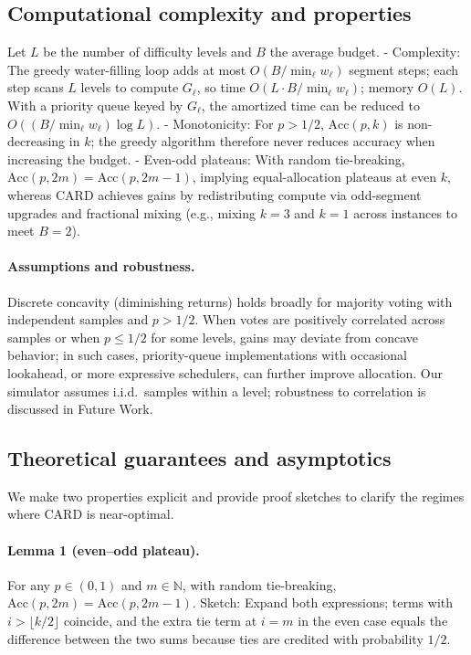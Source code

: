 \documentclass[11pt]{article}
\begin{document}
\subsection{Computational complexity and properties}
Let $L$ be the number of difficulty levels and $B$ the average budget.
- Complexity: The greedy water-filling loop adds at most $O(B/\min_\ell w_\ell)$ segment steps; each step scans $L$ levels to compute $G_\ell$, so time $O(L \cdot B/\min_\ell w_\ell)$; memory $O(L)$. With a priority queue keyed by $G_\ell$, the amortized time can be reduced to $O((B/\min_\ell w_\ell)\log L)$.
- Monotonicity: For $p>1/2$, $\mathrm{Acc}(p,k)$ is non-decreasing in $k$; the greedy algorithm therefore never reduces accuracy when increasing the budget.
- Even-odd plateaus: With random tie-breaking, $\mathrm{Acc}(p,2m)=\mathrm{Acc}(p,2m{-}1)$, implying equal-allocation plateaus at even $k$, whereas CARD achieves gains by redistributing compute via odd-segment upgrades and fractional mixing (e.g., mixing $k{=}3$ and $k{=}1$ across instances to meet $B{=}2$).

\paragraph{Assumptions and robustness.}
Discrete concavity (diminishing returns) holds broadly for majority voting with independent samples and $p>1/2$. When votes are positively correlated across samples or when $p\le 1/2$ for some levels, gains may deviate from concave behavior; in such cases, priority-queue implementations with occasional lookahead, or more expressive schedulers, can further improve allocation. Our simulator assumes i.i.d.\ samples within a level; robustness to correlation is discussed in Future Work.

\subsection{Theoretical guarantees and asymptotics}
We make two properties explicit and provide proof sketches to clarify the regimes where CARD is near-optimal.
\paragraph{Lemma 1 (even--odd plateau).}
For any $p\in(0,1)$ and $m\in\mathbb{N}$, with random tie-breaking,
$\mathrm{Acc}(p,2m)=\mathrm{Acc}(p,2m{-}1)$.
Sketch: Expand both expressions; terms with $i>\lfloor k/2\rfloor$ coincide, and the extra tie term at $i{=}m$ in the even case equals the difference between the two sums because ties are credited with probability $1/2$.
\end{document}
